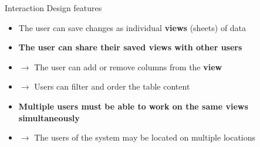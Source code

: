 \documentclass[aspectratio=169]{beamer}
\begin{document}

\begin{frame}{Interaction Design features}
    \begin{itemize}
        \item The user can save changes as individual \textbf{views} (sheets) of data
        \item \textbf{The user can share their saved views with other users}
        \item[] $\rightarrow$ The user can add or remove columns from the \textbf{view}
        \item[] $\rightarrow$ Users can filter and order the table content
        \item \textbf{Multiple users must be able to work on the same views simultaneously}
        \item[] $\rightarrow$ The users of the system may be located on multiple locations
    \end{itemize} 
\end{frame}
\end{document}
